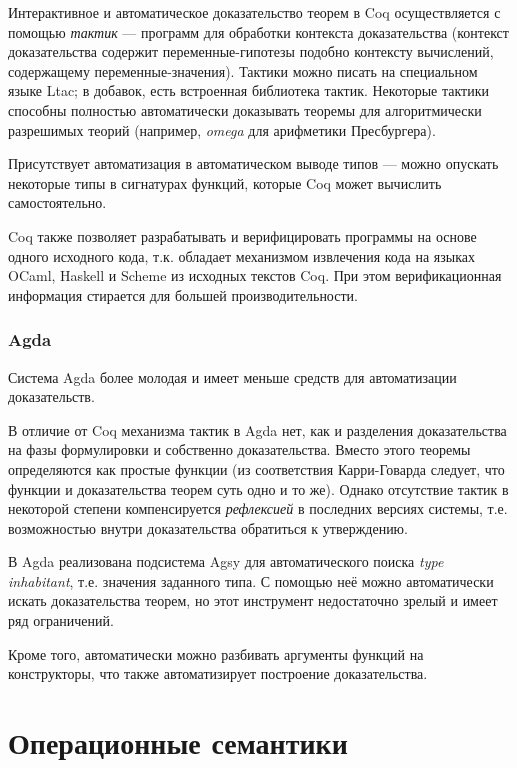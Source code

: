 \documentclass[aps,12pt,final,oneside,onecolumn,musixtex,superscriptaddress,centertags]{article}
\begin{document}
     Интерактивное и автоматическое доказательство теорем в Coq осуществляется с помощью \emph{тактик} --- программ для обработки контекста доказательства (контекст доказательства содержит переменные-гипотезы подобно контексту вычислений, содержащему переменные-значения). Тактики можно писать на специальном языке Ltac; в добавок, есть встроенная библиотека тактик. Некоторые тактики способны полностью автоматически доказывать теоремы для алгоритмически разрешимых теорий (например, \emph{omega} для арифметики Пресбургера).

     Присутствует автоматизация в автоматическом выводе типов --- можно опускать некоторые типы в сигнатурах функций, которые Coq может вычислить самостоятельно.

     Coq также позволяет разрабатывать и верифицировать программы на основе одного исходного кода, т.к. обладает механизмом извлечения кода на языках OCaml, Haskell и Scheme из исходных текстов Coq. При этом верификационная информация стирается для большей производительности.

  \newpage
  \subsubsection{Agda}

     Система Agda более молодая и имеет меньше средств для автоматизации доказательств.

     В отличие от Coq механизма тактик в Agda нет, как и разделения доказательства на фазы формулировки и собственно доказательства. Вместо этого теоремы определяются как простые функции (из соответствия Карри-Говарда следует, что функции и доказательства теорем суть одно и то же). Однако отсутствие тактик в некоторой степени компенсируется \emph{рефлексией} в последних версиях системы, т.е. возможностью внутри доказательства обратиться к утверждению.

     В Agda реализована подсистема Agsy для автоматического поиска \emph{type inhabitant}, т.е. значения заданного типа. С помощью неё можно автоматически искать доказательства теорем, но этот инструмент недостаточно зрелый и имеет ряд ограничений.

     Кроме того, автоматически можно разбивать аргументы функций на конструкторы, что также автоматизирует построение доказательства.

  \newpage
  \section{Операционные семантики}
\end{document}
